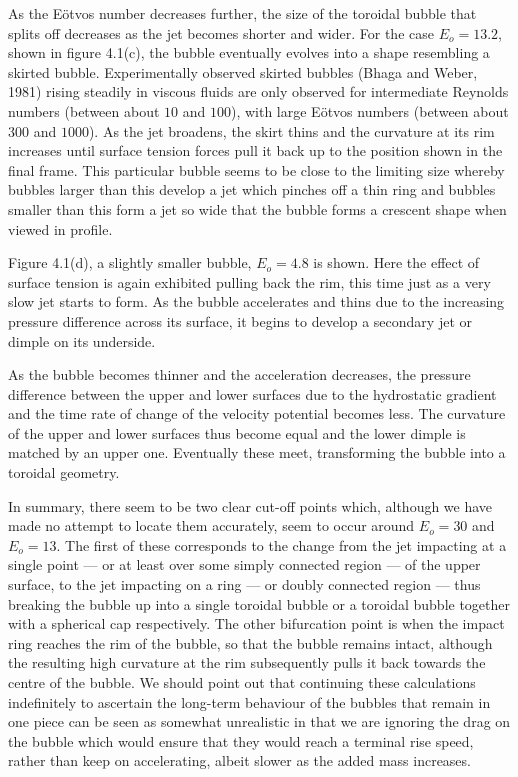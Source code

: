 As the E\"otvos number decreases further, the size of the toroidal bubble 
that splits off decreases as the jet becomes shorter and wider. For the case 
$E_o=13.2$, shown in figure 4.1(c),
the bubble eventually evolves into a shape resembling a skirted bubble.
Experimentally observed skirted bubbles (Bhaga and Weber,
1981) rising steadily in viscous fluids are only observed 
for intermediate Reynolds numbers (between about $10$ and $100$),
with large E\"otvos numbers (between about $300$ and $1000$).
As the jet broadens, the skirt thins and the curvature at its rim increases
until surface tension forces pull it back up to the position shown in the
final frame. This particular bubble seems to be close to the limiting
size whereby bubbles larger than this develop a jet which pinches off
a thin ring and bubbles smaller than this form a jet so wide that the
bubble forms a crescent shape when viewed in profile.

Figure 4.1(d), a slightly smaller bubble, $E_o=4.8$ is shown. Here
the effect of surface tension is again exhibited pulling back the rim,
this time just as a very slow jet starts to form. As the bubble accelerates
and thins due to the increasing pressure difference across 
its surface, it begins to develop a secondary jet or dimple on its underside. 

As the bubble becomes thinner and the acceleration decreases,
the pressure difference between the upper and 
lower surfaces due to the hydrostatic gradient and the time rate
of change of the velocity potential becomes less.
The curvature of the upper and lower surfaces thus become equal
and the lower dimple is matched by an upper one. Eventually these
meet, transforming the bubble into a toroidal geometry.

In summary, there seem to be two clear cut-off points which, although
we have made no attempt to locate them accurately, seem to occur around
$E_o=30$ and $E_o=13$. The first of these corresponds to the change from the
jet impacting at a single
point --- or at least over some simply connected region ---
of the upper surface, to the jet impacting on a ring --- or doubly
connected region --- thus breaking the bubble up into a single
toroidal bubble or a toroidal bubble together with a spherical cap
respectively.
The other bifurcation point is when the impact ring reaches
the rim of the bubble, so that the bubble remains intact, although 
the resulting high curvature at the rim subsequently pulls it back towards the 
centre of the bubble.
We should point out that continuing these calculations indefinitely
to ascertain the long-term behaviour of the bubbles that remain in one piece
can be seen as somewhat unrealistic in that we are ignoring
the drag on the bubble which would ensure that they would
reach a terminal rise speed, rather than keep on accelerating, albeit
slower as the added mass increases.

